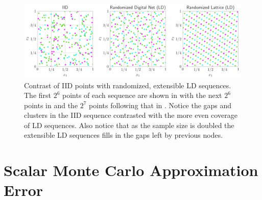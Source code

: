 \documentclass{article}[12pt]
\begin{document}
\begin{figure}[H]
    \centering
    \includegraphics[width=\textwidth]{figs/ld_seqs.pdf}
    \caption{Contrast of IID points with randomized, extensible LD sequences. The first $2^6$ points of each sequence are shown in  with the next $2^6$ points in  and the $2^7$ points following that in . Notice the gaps and clusters in the IID sequence contrasted with the more even coverage of LD sequences. Also notice that as the sample size is doubled the extensible LD sequences fills in the gaps left by previous nodes.}
    \label{fig:ld_seqs}
\end{figure}


\section{Scalar Monte Carlo Approximation Error}\label{sec:Existing_QMC_Methods}
\end{document}
